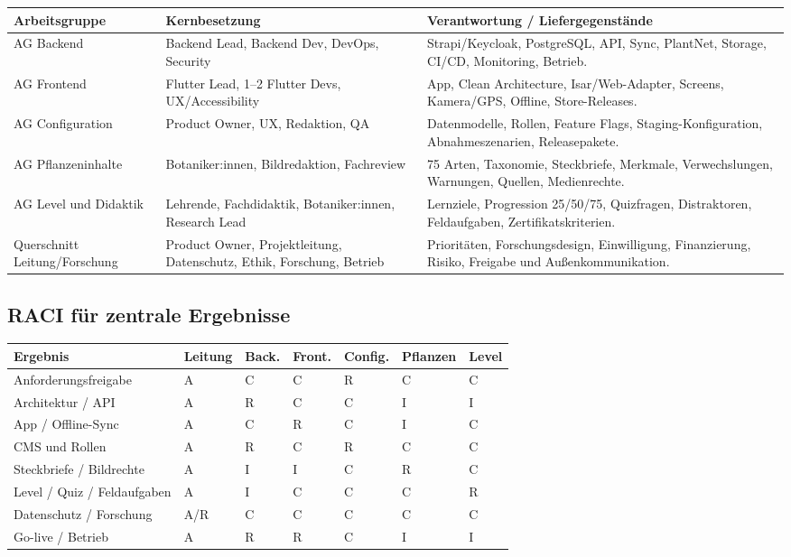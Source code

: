 \documentclass[10pt,a4paper,oneside]{article}
\begin{document}
\begin{longtable}{@{}p{34mm}p{51mm}p{73mm}@{}}
\toprule
\textbf{Arbeitsgruppe} & \textbf{Kernbesetzung} & \textbf{Verantwortung / Liefergegenstände} \\
\midrule
\endhead
AG Backend & Backend Lead, Backend Dev, DevOps, Security & Strapi/Keycloak, PostgreSQL, API, Sync, PlantNet, Storage, CI/CD, Monitoring, Betrieb. \\
AG Frontend & Flutter Lead, 1--2 Flutter Devs, UX/Accessibility & App, Clean Architecture, Isar/Web-Adapter, Screens, Kamera/GPS, Offline, Store-Releases. \\
AG Configuration & Product Owner, UX, Redaktion, QA & Datenmodelle, Rollen, Feature Flags, Staging-Konfiguration, Abnahmeszenarien, Releasepakete. \\
AG Pflanzeninhalte & Botaniker:innen, Bildredaktion, Fachreview & 75 Arten, Taxonomie, Steckbriefe, Merkmale, Verwechslungen, Warnungen, Quellen, Medienrechte. \\
AG Level und Didaktik & Lehrende, Fachdidaktik, Botaniker:innen, Research Lead & Lernziele, Progression 25/50/75, Quizfragen, Distraktoren, Feldaufgaben, Zertifikatskriterien. \\
Querschnitt Leitung/Forschung & Product Owner, Projektleitung, Datenschutz, Ethik, Forschung, Betrieb & Prioritäten, Forschungsdesign, Einwilligung, Finanzierung, Risiko, Freigabe und Außenkommunikation. \\
\bottomrule
\end{longtable}

\subsection{RACI für zentrale Ergebnisse}

\footnotesize
\begin{tabularx}{\textwidth}{@{}p{42mm}*{6}{>{\centering\arraybackslash}X}@{}}
\toprule
\textbf{Ergebnis} & \textbf{Leitung} & \textbf{Back.} & \textbf{Front.} & \textbf{Config.} & \textbf{Pflanzen} & \textbf{Level} \\
\midrule
Anforderungsfreigabe & A & C & C & R & C & C \\
Architektur / API & A & R & C & C & I & I \\
App / Offline-Sync & A & C & R & C & I & C \\
CMS und Rollen & A & R & C & R & C & C \\
Steckbriefe / Bildrechte & A & I & I & C & R & C \\
Level / Quiz / Feldaufgaben & A & I & C & C & C & R \\
Datenschutz / Forschung & A/R & C & C & C & C & C \\
Go-live / Betrieb & A & R & R & C & I & I \\
\bottomrule
\end{tabularx}
\normalsize
\end{document}
